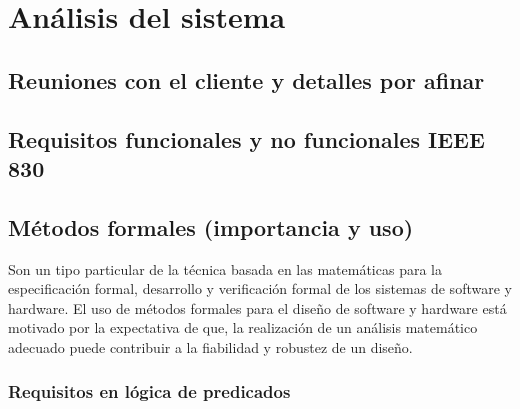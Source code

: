 \section{Análisis del sistema}

\subsection{Reuniones con el cliente y detalles por afinar}

\subsection{Requisitos funcionales y no funcionales IEEE 830}

\subsection{Métodos formales (importancia y uso)}
Son un tipo particular de la técnica basada en las matemáticas para la especificación formal, desarrollo y verificación formal de los sistemas de software y hardware. El uso de métodos formales para el diseño de software y hardware está motivado por la expectativa de que, la realización de un análisis matemático adecuado puede contribuir a la fiabilidad y robustez de un diseño. 

\subsubsection{Requisitos en lógica de predicados}